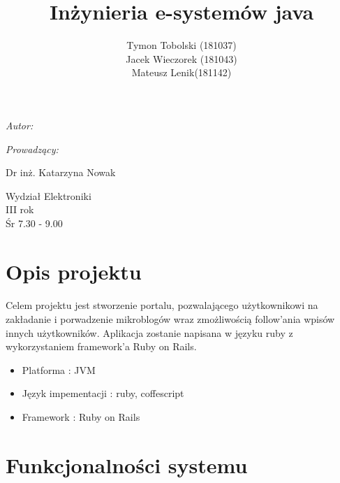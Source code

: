 \documentclass[wide,a4paper,titlepage,12pt] {article}
\title{Inżynieria e-systemów java}
\author{Tymon Tobolski (181037)\\ Jacek Wieczorek (181043) \\ Mateusz Lenik(181142)}
\makeatletter
\renewcommand{\maketitle}{
\begin{titlepage}
  \begin{center}
    \vspace*{3cm}
    \LARGE \@title \par
    \vspace{2cm}
    \textit{\small Autor:}\par
    \normalsize \@author\par \normalsize
    \vspace{3cm}
    \textit{\small Prowadzący:}\par
    Dr inż. Katarzyna Nowak \par
    \vspace{2cm}
    Wydział Elektroniki\\ III rok\\ Śr 7.30 - 9.00\par

  \end{center}
\end{titlepage}
}
\makeatother
\begin{document}
\maketitle
  \section{Opis projektu}
  \paragraph{}
  Celem projektu jest stworzenie portalu, pozwalającego użytkownikowi na zakładanie i porwadzenie mikroblogów wraz zmożliwością follow'ania wpisów innych użytkowników. Aplikacja zostanie napisana w języku ruby z wykorzystaniem framework'a Ruby on Rails.
  \begin{itemize}
    \item Platforma : JVM
    \item Język impementacji : ruby, coffescript
    \item Framework : Ruby on Rails 
  \end{itemize}
  \section{Funkcjonalności systemu}
\end{document}
